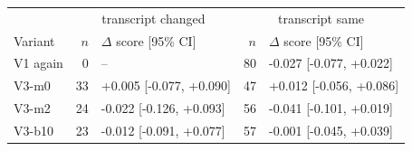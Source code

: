 \begin{tabular}{lrlrl}
\toprule
 & \multicolumn{2}{c}{transcript changed} & \multicolumn{2}{c}{transcript same} \\
Variant & $n$ & $\Delta$ score [95\% CI] & $n$ & $\Delta$ score [95\% CI] \\
\midrule
V1 again & 0 & -- & 80 & -0.027 [-0.077, +0.022] \\
V3-m0 & 33 & +0.005 [-0.077, +0.090] & 47 & +0.012 [-0.056, +0.086] \\
V3-m2 & 24 & -0.022 [-0.126, +0.093] & 56 & -0.041 [-0.101, +0.019] \\
V3-b10 & 23 & -0.012 [-0.091, +0.077] & 57 & -0.001 [-0.045, +0.039] \\
\bottomrule
\end{tabular}
